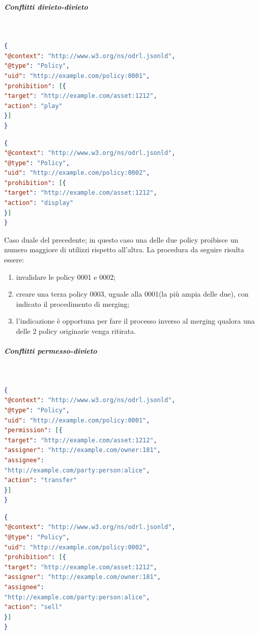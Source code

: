 \documentclass[12pt,a4paper,twoside]{book}
\begin{document}
\subparagraph{Conflitti divieto-divieto}\label{divdiv}\mbox{}\\
\begin{lstlisting}[language=json,firstnumber=1,caption={La policy 0001 proibisce un qualsiasi utilizzo dell'asset 1212 a chiunque},captionpos=b]
{
"@context": "http://www.w3.org/ns/odrl.jsonld",
"@type": "Policy",
"uid": "http://example.com/policy:0001",
"prohibition": [{
"target": "http://example.com/asset:1212",
"action": "play"
}]
}
\end{lstlisting}
\begin{lstlisting}[language=json,firstnumber=1,caption={La policy 0002 proibisce la riproduzione dell'asset 1212 a chiunque},captionpos=b]
{
"@context": "http://www.w3.org/ns/odrl.jsonld",
"@type": "Policy",
"uid": "http://example.com/policy:0002",
"prohibition": [{
"target": "http://example.com/asset:1212",
"action": "display"
}]
}
\end{lstlisting}
Caso duale del precedente; in questo caso una delle due policy proibisce un numero maggiore di utilizzi rispetto all'altra. La procedura da seguire risulta essere:
\begin{enumerate}
	\item invalidare le policy 0001 e 0002;
	\item creare una terza policy 0003, uguale alla 0001(la più ampia delle due), con indicato il procedimento di merging;
	\item l'indicazione è opportuna per fare il processo inverso al merging qualora una delle 2 policy originarie venga ritirata.
\end{enumerate}
\subparagraph{Conflitti permesso-divieto}\label{permdiv}\mbox{}\\
\begin{lstlisting}[language=json,firstnumber=1,caption={La policy 0001 permette il trasferimento dell'asset 1212 al soggetto Alice},captionpos=b]
{
"@context": "http://www.w3.org/ns/odrl.jsonld",
"@type": "Policy",
"uid": "http://example.com/policy:0001",
"permission": [{
"target": "http://example.com/asset:1212",
"assigner": "http://example.com/owner:181",
"assignee": 
"http://example.com/party:person:alice",
"action": "transfer"
}]
}
\end{lstlisting}
\begin{lstlisting}[language=json,firstnumber=1,caption={La policy 0002 proibisce la vendita dell'asset 1212 al soggetto Alice},captionpos=b]
{
"@context": "http://www.w3.org/ns/odrl.jsonld",
"@type": "Policy",
"uid": "http://example.com/policy:0002",
"prohibition": [{
"target": "http://example.com/asset:1212",
"assigner": "http://example.com/owner:181",
"assignee": 
"http://example.com/party:person:alice",
"action": "sell"
}]
}
\end{lstlisting}
\end{document}
